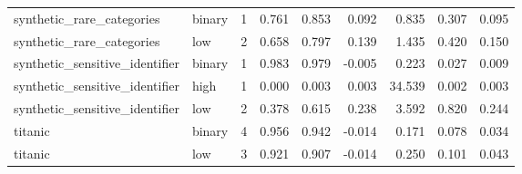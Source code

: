 \begin{table}
\begin{adjustbox}{max width=\textwidth}
\begin{tabular}{llrrrrrrr}
synthetic\_rare\_categories & binary & 1 & 0.761 & 0.853 & 0.092 & 0.835 & 0.307 & 0.095 \\
synthetic\_rare\_categories & low & 2 & 0.658 & 0.797 & 0.139 & 1.435 & 0.420 & 0.150 \\
synthetic\_sensitive\_identifier & binary & 1 & 0.983 & 0.979 & -0.005 & 0.223 & 0.027 & 0.009 \\
synthetic\_sensitive\_identifier & high & 1 & 0.000 & 0.003 & 0.003 & 34.539 & 0.002 & 0.003 \\
synthetic\_sensitive\_identifier & low & 2 & 0.378 & 0.615 & 0.238 & 3.592 & 0.820 & 0.244 \\
titanic & binary & 4 & 0.956 & 0.942 & -0.014 & 0.171 & 0.078 & 0.034 \\
titanic & low & 3 & 0.921 & 0.907 & -0.014 & 0.250 & 0.101 & 0.043 \\
\bottomrule
\end{tabular}
\end{adjustbox}
\end{table}
